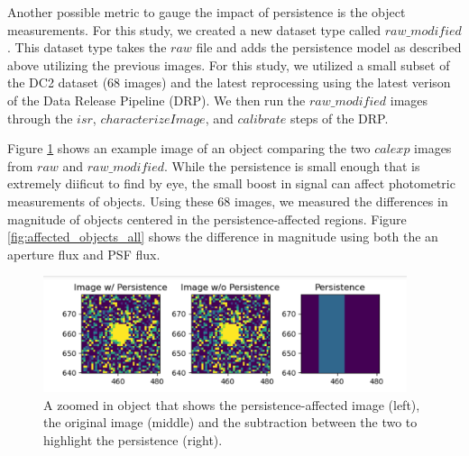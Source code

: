 \documentclass[DM,authoryear,toc]{lsstdoc}
\begin{document}
Another possible metric to gauge the impact of persistence is the object measurements.
For this study, we created a new dataset type called \texttt{$raw\_modified$}. 
This dataset type takes the \texttt{$raw$} file and adds the persistence model as described above utilizing the previous images.
For this study, we utilized a small subset of the DC2 dataset (68 images) and the latest reprocessing using the latest verison of the Data Release Pipeline (DRP).
We then run the \texttt{$raw\_modified$} images through the \texttt{$isr$}, \texttt{$characterizeImage$}, and \texttt{$calibrate$} steps of the DRP\@. 

Figure \ref{fig:ex_persistence} shows an example image of an object comparing the two \texttt{$calexp$} images from \texttt{$raw$} and \texttt{$raw\_modified$}.
While the persistence is small enough that is extremely diificut to find by eye, the small boost in signal can affect photometric measurements of objects.
Using these 68 images, we measured the differences in magnitude of objects centered in the persistence-affected regions.
Figure \ref{fig:affected_objects_all} shows the difference in magnitude using both the an aperture flux and PSF flux.

\begin{figure}[!htp]
  \centering
  \includegraphics[width=0.95\textwidth, angle=0]{Obj_pers.png}
  \caption{
  A zoomed in object that shows the persistence-affected image (left), the original image (middle) 
  and the subtraction between the two to highlight the persistence (right).
  }\label{fig:ex_persistence}
\end{figure}
\end{document}
